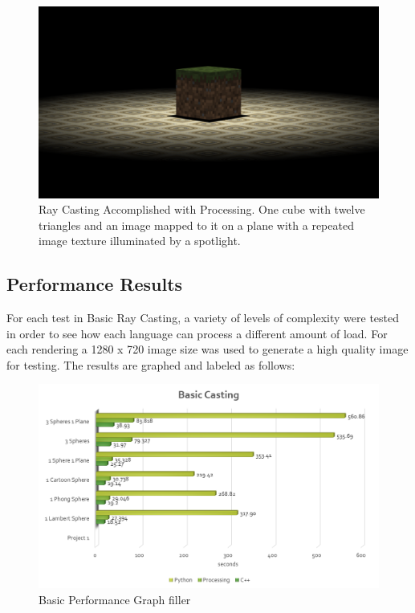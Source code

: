 \begin{figure}[ht]
\centering
\includegraphics[width=\textwidth]{figures/processingTriangles.png}
\caption{Ray Casting Accomplished with Processing. One cube with twelve triangles and an image mapped to it on a plane with a repeated image texture illuminated by a spotlight.}
\label{fig:processingtriangles}
\end{figure}

\subsection{Performance Results}
For each test in Basic Ray Casting, a variety of levels of complexity were tested in order to see how each language can process a different amount of load.  For each rendering a 1280 x 720 image size was used to generate a high quality image for testing.  The results are graphed and labeled as follows:
\begin{figure}[ht]
\centering
\includegraphics[width=\textwidth]{figures/graphs/basic-graph.png}
\caption{Basic Performance Graph filler}
\label{fig:basicgraph}
\end{figure}

